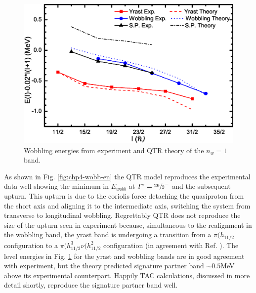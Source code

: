 \begin{figure}[b!]
\centerline{\includegraphics[width=\textwidth]{./img/c4/en_minus_rotor.eps}}
	\caption{Wobbling energies from experiment and QTR theory of the $n_w=1$ band.\label{fig:chp4-qtr-en-minus-rotor}}
\end{figure}

As shown in Fig. \ref{fig:chp4-wobb-en} the QTR model reproduces the experimental data well showing the minimum in $E_{wobb}$ at $I^{\pi}=\sfrac{29}{2}^-$ and the subsequent upturn. This upturn is due to the coriolis force detaching the quasiproton from the short axis and aligning it to the intermediate axis, switching the system from transverse to longitudinal wobbling. Regrettably QTR does not reproduce the size of the upturn seen in experiment because, simultaneous to the realignment in the wobbling band, the yrast band is undergoing a transition from a $\pi(h_{11/2}$ configuration to a $\pi(h_{11/2}^3\nu(h_{11/2}^2$ configuration (in agreement with Ref. \cite{ePaul135Pr}). The level energies in Fig. \ref{fig:chp4-qtr-en-minus-rotor} for the yrast and wobbling bands are in good agreement with experiment, but the theory predicted signature partner band $\sim0.5$MeV above its experimental counterpart. Happily TAC calculations, discussed in more detail shortly, reproduce the signature partner band well.

